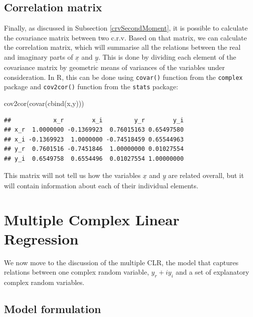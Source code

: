\documentclass[
]{book}
\newenvironment{Shaded}{\begin{snugshade}}{\end{snugshade}}
\newcommand{\FunctionTok}[1]{\textcolor[rgb]{0.00,0.00,0.00}{#1}}
\newcommand{\NormalTok}[1]{#1}
\begin{document}
\hypertarget{correlation-matrix}{%
\section{Correlation matrix}\label{correlation-matrix}}

Finally, as discussed in Subsection \ref{crvSecondMoment}, it is possible to calculate the covariance matrix between two c.r.v. Based on that matrix, we can calculate the correlation matrix, which will summarise all the relations between the real and imaginary parts of \(\underline{x}\) and \(\underline{y}\). This is done by dividing each element of the covariance matrix by geometric means of variances of the variables under consideration. In R, this can be done using \texttt{covar()} function from the \texttt{complex} package and \texttt{cov2cor()} function from the \texttt{stats} package:

\begin{Shaded}
\begin{Highlighting}[]
\FunctionTok{cov2cor}\NormalTok{(}\FunctionTok{covar}\NormalTok{(}\FunctionTok{cbind}\NormalTok{(x,y)))}
\end{Highlighting}
\end{Shaded}

\begin{verbatim}
##            x_r        x_i         y_r        y_i
## x_r  1.0000000 -0.1369923  0.76015163 0.65497580
## x_i -0.1369923  1.0000000 -0.74518459 0.65544963
## y_r  0.7601516 -0.7451846  1.00000000 0.01027554
## y_i  0.6549758  0.6554496  0.01027554 1.00000000
\end{verbatim}

This matrix will not tell us how the variables \(\underline{x}\) and \(\underline{y}\) are related overall, but it will contain information about each of their individual elements.

\hypertarget{multipleCLR}{%
\chapter{Multiple Complex Linear Regression}\label{multipleCLR}}

We now move to the discussion of the multiple CLR, the model that captures relations between one complex random variable, \(y_r + i y_i\) and a set of explanatory complex random variables.

\hypertarget{model-formulation}{%
\section{Model formulation}\label{model-formulation}}
\end{document}
